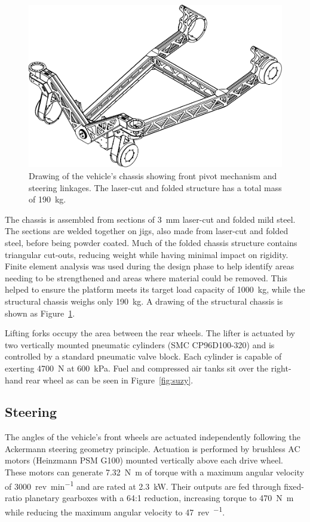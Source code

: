 \documentclass[preprint,authoryear,12pt]{elsarticle}
\begin{document}
        \begin{figure}[htb]
            \centering
            \includegraphics[width=0.6\linewidth]{imgs/profile_views/AMMP-Chassis-1-20.pdf}
            \caption{Drawing of the vehicle's chassis showing front pivot mechanism and steering linkages. The laser-cut and folded structure has a total mass of \SI{190}{\kilo\gram}.}
            \label{fig:AMMPChassis}
        \end{figure}

        The chassis is assembled from sections of \SI{3}{\milli\meter} laser-cut and folded mild steel.
        The sections are welded together on jigs, also made from laser-cut and folded steel, before being powder coated.
        Much of the folded chassis structure contains triangular cut-outs, reducing weight while having minimal impact on rigidity.
        Finite element analysis was used during the design phase to help identify areas needing to be strengthened and areas where material could be removed.
        This helped to ensure the platform meets its target load capacity of \SI{1000}{\kilo\gram}, while the structural chassis weighs only \SI{190}{\kilo\gram}.
        A drawing of the structural chassis is shown as Figure~\ref{fig:AMMPChassis}.

        Lifting forks occupy the area between the rear wheels.
        The lifter is actuated by two vertically mounted pneumatic cylinders (SMC CP96D100-320) and is controlled by a standard pneumatic valve block.
        Each cylinder is capable of exerting \SI{4700}{\newton} at \SI{600}{\kilo\pascal}.
        Fuel and compressed air tanks sit over the right-hand rear wheel as can be seen in Figure~\ref{fig:suzy}.

    \subsection{Steering}
    \label{sub:steering}

        The angles of the vehicle's front wheels are actuated independently following the Ackermann steering geometry principle.
        Actuation is performed by brushless AC motors (Heinzmann PSM G100) mounted vertically above each drive wheel.
        These motors can generate \SI{7.32}{\newton\meter} of torque with a maximum angular velocity of \SI{3000}{rev\per\minute} and are rated at \SI{2.3}{\kilo\watt}.
        Their outputs are fed through fixed-ratio planetary gearboxes with a 64:1 reduction, increasing torque to \SI{470}{\newton\meter} while reducing the maximum angular velocity to \SI{47}{rev\per\min}.
\end{document}

